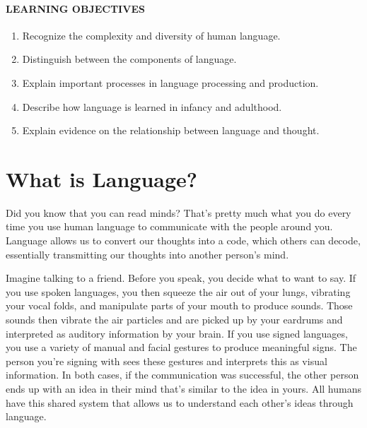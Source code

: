 \documentclass[
]{krantz}
\providecommand{\tightlist}{%
  \setlength{\itemsep}{0pt}\setlength{\parskip}{0pt}}
\begin{document}
\paragraph*{LEARNING OBJECTIVES}\label{learning-objectives-7}

\begin{enumerate}
\def\labelenumi{\arabic{enumi}.}
\tightlist
\item
  Recognize the complexity and diversity of human language.
\item
  Distinguish between the components of language.
\item
  Explain important processes in language processing and production.
\item
  Describe how language is learned in infancy and adulthood.
\item
  Explain evidence on the relationship between language and thought.
\end{enumerate}

\section{What is Language?}\label{what-is-language}

Did you know that you can read minds? That's pretty much what you do every time you use human language to communicate with the people around you. Language allows us to convert our thoughts into a code, which others can decode, essentially transmitting our thoughts into another person's mind.

Imagine talking to a friend. Before you speak, you decide what to want to say. If you use spoken languages, you then squeeze the air out of your lungs, vibrating your vocal folds, and manipulate parts of your mouth to produce sounds. Those sounds then vibrate the air particles and are picked up by your eardrums and interpreted as auditory information by your brain. If you use signed languages, you use a variety of manual and facial gestures to produce meaningful signs. The person you're signing with sees these gestures and interprets this as visual information. In both cases, if the communication was successful, the other person ends up with an idea in their mind that's similar to the idea in yours. All humans have this shared system that allows us to understand each other's ideas through language.
\end{document}
